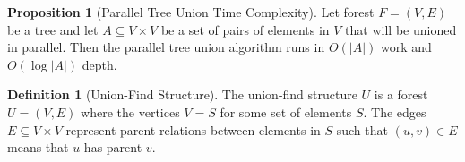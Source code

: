 \documentclass[a4paper,12pt]{article}
\theoremstyle{definition}
\newtheorem{definition}{Definition}[section]
\newtheorem{proposition}{Proposition}[section]
\begin{document}
\begin{proposition}[Parallel Tree Union Time Complexity]
    Let forest $F = (V, E)$ be a tree and let $A \subseteq V \times V$ be a set of pairs
    of elements in $V$ that will be unioned in parallel. Then the parallel tree union
    algorithm runs in $O(|A|)$ work and $O(\log |A|)$ depth.
\end{proposition}

\begin{definition}[Union-Find Structure]
    The union-find structure $U$ is a forest $U = (V, E)$ where the vertices $V
    = S$ for some set of elements $S$. The edges $E \subseteq V \times V$
    represent parent relations between elements in $S$ such that $(u, v) \in E$
    means that $u$ has parent $v$.
\end{definition}
\end{document}
